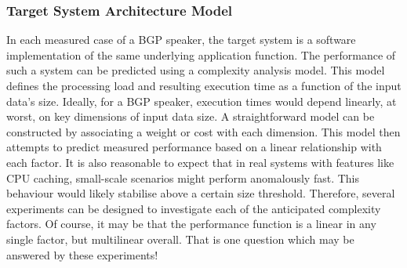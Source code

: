 \subsubsection*{Target System Architecture Model}
In each measured case of a BGP speaker, the target system is a software implementation of the same underlying application function.
The performance of such a system can be predicted using a complexity analysis model.
This model defines the processing load and resulting execution time as a function of the input data's size.
Ideally, for a BGP speaker, execution times would depend linearly, at worst, on key dimensions of input data size.
A straightforward model can be constructed by associating a weight or cost with each dimension.
This model then attempts to predict measured performance based on a linear relationship with each factor.
It is also reasonable to expect that in real systems with features like CPU caching, small-scale scenarios might perform anomalously fast.
This behaviour would likely stabilise above a certain size threshold.
Therefore, several experiments can be designed to investigate each of the anticipated complexity factors.
Of course, it may be that the performance function is a linear in any single factor, but multilinear overall.
That is one question which may be answered by these experiments!



